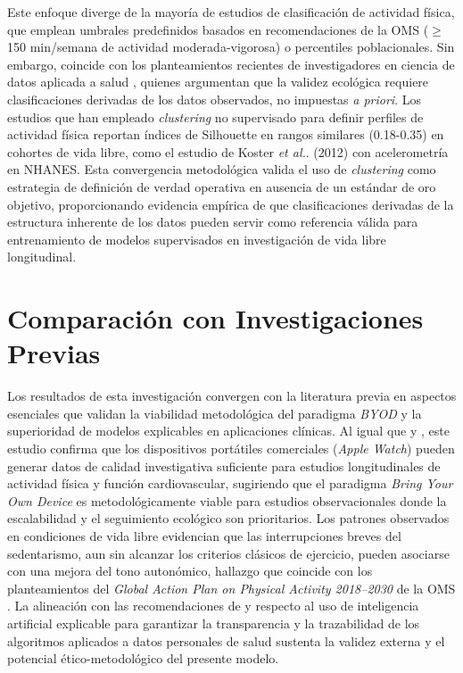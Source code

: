 Este enfoque diverge de la mayoría de estudios de clasificación de actividad física, que emplean umbrales predefinidos basados en recomendaciones de la OMS ($\geq$ 150 min/semana de actividad moderada-vigorosa) o percentiles poblacionales. Sin embargo, coincide con los planteamientos recientes de investigadores en ciencia de datos aplicada a salud \cite{Liu2022}, quienes argumentan que la validez ecológica requiere clasificaciones derivadas de los datos observados, no impuestas \textit{a priori}. Los estudios que han empleado \textit{clustering} no supervisado para definir perfiles de actividad física reportan índices de Silhouette en rangos similares (0.18-0.35) en cohortes de vida libre, como el estudio de Koster \textit{et al.}. (2012) con acelerometría en NHANES. Esta convergencia metodológica valida el uso de \textit{clustering} como estrategia de definición de verdad operativa en ausencia de un estándar de oro objetivo, proporcionando evidencia empírica de que clasificaciones derivadas de la estructura inherente de los datos pueden servir como referencia válida para entrenamiento de modelos supervisados en investigación de vida libre longitudinal.


\section{Comparación con Investigaciones Previas}
\label{sec:comparacion_investigaciones}

Los resultados de esta investigación convergen con la literatura previa en aspectos esenciales que validan la viabilidad metodológica del paradigma \textit{BYOD} y la superioridad de modelos explicables en aplicaciones clínicas. Al igual que \cite{Henriksen2018} y \cite{Strain2020}, este estudio confirma que los dispositivos portátiles comerciales (\textit{Apple Watch}) pueden generar datos de calidad investigativa suficiente para estudios longitudinales de actividad física y función cardiovascular, sugiriendo que el paradigma \textit{Bring Your Own Device} es metodológicamente viable para estudios observacionales donde la escalabilidad y el seguimiento ecológico son prioritarios. Los patrones observados en condiciones de vida libre evidencian que las interrupciones breves del sedentarismo, aun sin alcanzar los criterios clásicos de ejercicio, pueden asociarse con una mejora del tono autonómico, hallazgo que coincide con los planteamientos del \textit{Global Action Plan on Physical Activity 2018--2030} de la OMS \cite{WHO2018,Bull2020}. La alineación con las recomendaciones de \cite{Escalante2023} y \cite{Vellido2020Importance} respecto al uso de inteligencia artificial explicable para garantizar la transparencia y la trazabilidad de los algoritmos aplicados a datos personales de salud sustenta la validez externa y el potencial ético-metodológico del presente modelo.

